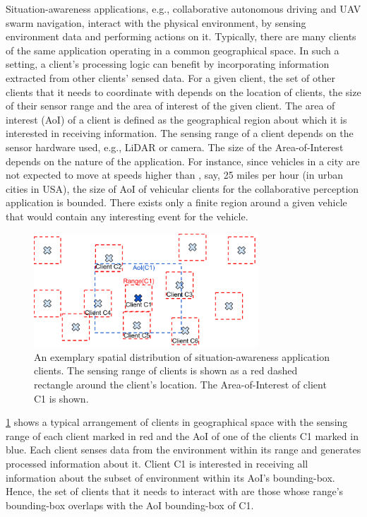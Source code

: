 Situation-awareness applications, e.g., collaborative autonomous driving and UAV swarm navigation, interact with the physical environment, by sensing environment data and performing actions on it. Typically, there are many clients of the same application operating in a common geographical space. In such a setting, a client's processing logic can benefit by incorporating information extracted from other clients' sensed data. For a given client, the set of other clients that it needs to coordinate with depends on the location of clients, the size of their sensor range and the area of interest of the given client. The area of interest (AoI) of a client is defined as the geographical region about which it is interested in receiving information. The sensing range of a client depends on the sensor hardware used, e.g., LiDAR or camera. The size of the Area-of-Interest depends on the nature of the application. For instance, since vehicles in a city are not expected to move at speeds higher than , say, 25 miles per hour (in urban cities in USA), the size of AoI of vehicular clients for the collaborative perception application is bounded. There exists only a finite region around a given vehicle that would contain any interesting event for the vehicle.
\begin{figure}
\centering
\includegraphics[width=0.75\textwidth]{figures/mechanisms/spatial_ctx_mgmt/aoi_range.pdf}
\caption{An exemplary spatial distribution of situation-awareness application clients. The sensing range of clients is shown as a red dashed rectangle around the client's location. The Area-of-Interest of client C1 is shown.}
\label{fig:aoi_range}
\end{figure}
\cref{fig:aoi_range} shows a typical arrangement of clients in geographical space with the sensing range of each client marked in red and the AoI of one of the clients C1 marked in blue. Each client senses data from the environment within its range and generates processed information about it. Client C1 is interested in receiving all information about the subset of environment within its AoI's bounding-box. Hence, the set of clients that it needs to interact with are those whose range's bounding-box overlaps with the AoI bounding-box of C1. 

